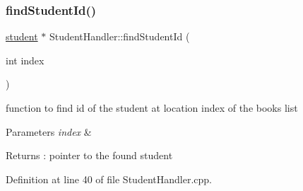\subsubsection{\texorpdfstring{find\+Student\+Id()}{findStudentId()}}
{\footnotesize\ttfamily \hyperlink{classstudent}{student} $\ast$ Student\+Handler\+::find\+Student\+Id (\begin{DoxyParamCaption}\item[{int}]{index }\end{DoxyParamCaption})}

function to find id of the student at location index of the books list 
\begin{DoxyParams}{Parameters}
{\em index} & \\
\hline
\end{DoxyParams}
\begin{DoxyReturn}{Returns}
\+: pointer to the found student 
\end{DoxyReturn}


Definition at line 40 of file Student\+Handler.\+cpp.


